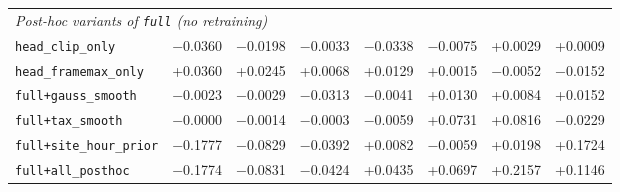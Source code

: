 \begin{table}[H]
\begin{adjustbox}{max width=\linewidth}
\begin{tabular}{lrrrrrrr}
\midrule
\multicolumn{8}{l}{\emph{Post-hoc variants of \texttt{full} (no retraining)}} \\
\texttt{head\_clip\_only} & $-$0.0360 & $-$0.0198 & $-$0.0033 & $-$0.0338 & $-$0.0075 & +0.0029 & +0.0009 \\
\texttt{head\_framemax\_only} & +0.0360 & +0.0245 & +0.0068 & +0.0129 & +0.0015 & $-$0.0052 & $-$0.0152 \\
\texttt{full+gauss\_smooth} & $-$0.0023 & $-$0.0029 & $-$0.0313 & $-$0.0041 & +0.0130 & +0.0084 & +0.0152 \\
\texttt{full+tax\_smooth} & $-$0.0000 & $-$0.0014 & $-$0.0003 & $-$0.0059 & +0.0731 & +0.0816 & $-$0.0229 \\
\texttt{full+site\_hour\_prior} & $-$0.1777 & $-$0.0829 & $-$0.0392 & +0.0082 & $-$0.0059 & +0.0198 & +0.1724 \\
\texttt{full+all\_posthoc} & $-$0.1774 & $-$0.0831 & $-$0.0424 & +0.0435 & +0.0697 & +0.2157 & +0.1146 \\
\bottomrule
\end{tabular}
\end{adjustbox}
\end{table}
